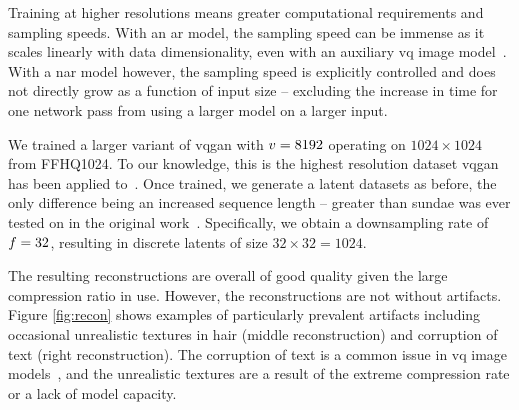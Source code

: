 Training at higher resolutions means greater computational requirements and
sampling speeds. With an \gls{ar} model, the sampling speed can be
immense as it scales linearly with data dimensionality, even with an
auxiliary \gls{vq} image model~\cite{esser2021taming}. With a
\gls{nar} model however, the sampling speed is explicitly controlled
and does not directly grow as a function of input size -- excluding the
increase in time for one network pass from using a larger model on a larger input.

We trained a larger variant of \gls{vqgan} with $v = 8192$ operating on
$1024 \times 1024$ from FFHQ1024. To our knowledge, this is the highest resolution
dataset \gls{vqgan} has been applied to~\cite{esser2021taming}. Once trained,
we generate a latent datasets as before, the only difference being an increased
sequence length -- greater than \gls{sundae} was ever tested on in the original
work~\cite{savinov2022stepunrolled}. Specifically, we obtain a downsampling rate
of $f=32$, resulting in discrete latents of size $32 \times 32 =
1024$.

The resulting reconstructions are overall of good quality given the large
compression ratio in use. However, the reconstructions are not without
artifacts. Figure \ref{fig:recon} shows examples of particularly prevalent
artifacts including occasional unrealistic textures in hair (middle
reconstruction) and corruption of text (right reconstruction). The corruption of
text is a common issue in \gls{vq} image models~\cite{ramesh2021dalle}, and the
unrealistic textures are a result of the extreme compression rate or a lack of
model capacity.


